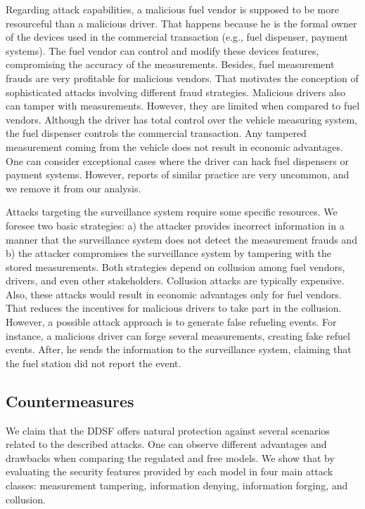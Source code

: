 \documentclass[sigplan]{acmart}
\begin{document}
Regarding attack capabilities, a malicious fuel vendor is supposed to be more resourceful than a malicious driver. 
That happens because he is the formal owner of the devices used in the commercial transaction (e.g., fuel dispenser, payment systems).
The fuel vendor can control and modify these devices features, compromising the accuracy of the measurements.
Besides, fuel measurement frauds are very profitable for malicious vendors.
That motivates the conception of sophisticated attacks involving different fraud strategies. 
Malicious drivers also can tamper with measurements.
However, they are limited when compared to fuel vendors.
Although the driver has total control over the vehicle measuring system, the fuel dispenser controls the commercial transaction.
Any tampered measurement coming from the vehicle does not result in economic advantages.
One can consider exceptional cases where the driver can hack fuel dispensers or payment systems.
However, reports of similar practice are very uncommon, and we remove it from our analysis.

Attacks targeting the surveillance system require some specific resources.
We foresee two basic strategies: a) the attacker provides incorrect information in a manner that the surveillance system does not detect the measurement frauds and b) the attacker compromises the surveillance system by tampering with the stored measurements.
Both strategies depend on collusion among fuel vendors, drivers, and even other stakeholders.
Collusion attacks are typically expensive.
Also, these attacks would result in economic advantages only for fuel vendors.
That reduces the incentives for malicious drivers to take part in the collusion.
However, a possible attack approach is to generate false refueling events.
For instance, a malicious driver can forge several measurements, creating fake refuel events.
After, he sends the information to the surveillance system, claiming that the fuel station did not report the event.

\subsection{Countermeasures}
We claim that the DDSF offers natural protection against several scenarios related to the described attacks.
One can observe different advantages and drawbacks when comparing the regulated and free models.
We show that by evaluating the security features provided by each model in four main attack classes: measurement tampering, information denying, information forging, and collusion.
\end{document}
